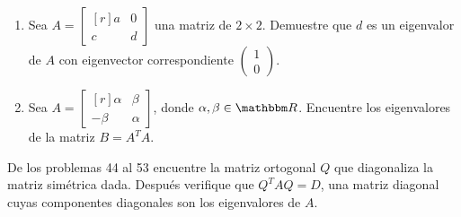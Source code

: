 \begin{enumerate}[resume]
    \item Sea $A=\begin{bmatrix*}[r]a & 0 \\ c & d\end{bmatrix*}$ una matriz de $2 \times 2$. Demuestre que $d$ es un eigenvalor de $A$ con eigenvector correspondiente $\begin{pmatrix*}1 \\ 0\end{pmatrix*}$.\newpage
    \item Sea $A=\begin{bmatrix*}[r]\alpha & \beta \\ -\beta & \alpha\end{bmatrix*}$, donde $\alpha, \beta \in \RR$. Encuentre los eigenvalores de la matriz $B=A^{T} A$.
\end{enumerate}
De los problemas 44 al 53 encuentre la matriz ortogonal $Q$ que diagonaliza la matriz simétrica dada. Después verifique que $Q^{T} A Q=D$, una matriz diagonal cuyas componentes diagonales son los eigenvalores de $A$.
